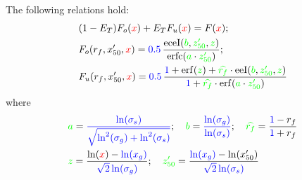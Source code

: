 \documentclass[12pt,reqno,intlimits,twoside]{amsart}
\DeclareMathOperator{\erf}{erf}%
\DeclareMathOperator{\erfc}{erfc}%
\DeclareMathOperator{\eeI}{eeI}%
\DeclareMathOperator{\eceI}{eceI}%
\begin{document}
The following relations hold:
\begin{align*}
   & (1 - E_T) F_o(\textcolor{red}{x}) + E_T F_u(\textcolor{red}{x})= F(\textcolor{red}{x});\\
   & F_o(r_f, x'_{50}, \textcolor{red}{x}) =
     \textcolor{blue}{0.5}\,
     \dfrac{\eceI(\textcolor{green}{b}, \textcolor{green}{z'_{50}}, \textcolor{green}{z})}%
           {\erfc(\textcolor{green}{a}\cdot \textcolor{green}{z'_{50}})};\\
   & F_u(r_f, x'_{50}, \textcolor{red}{x}) =
     \textcolor{blue}{0.5}\,
     \dfrac{\textcolor{blue}{1} +
            \erf(\textcolor{green}{z}) +
            \textcolor{green}{\widehat{r_f}}\cdot
            \eeI(\textcolor{green}{b}, \textcolor{green}{z'_{50}}, \textcolor{green}{z})
           }%
           {\textcolor{blue}{1} +
            \textcolor{green}{\widehat{r_f}}\cdot
            \erf(\textcolor{green}{a}\cdot \textcolor{green}{z'_{50}})
           }
\end{align*}
where
\begin{align*}
  &
  \textcolor{green}{a} =
  \textcolor{blue}{\dfrac{\ln(\sigma_s)}{\sqrt{\ln^2(\sigma_g) + \ln^2(\sigma_s)}}};\quad
  \textcolor{green}{b} =
  \textcolor{blue}{\dfrac{\ln(\sigma_g)}{\ln(\sigma_s)}};\quad
  \textcolor{green}{\widehat{r_f}} =
  \dfrac{\textcolor{blue}{1} - r_f}{\textcolor{blue}{1} + r_f}\\
  &
  \textcolor{green}{z} =
  \dfrac{\ln(\textcolor{red}{x}) - \textcolor{blue}{\ln(x_g)}}{\textcolor{blue}{\sqrt{2}\ln(\sigma_g)}};\quad
  \textcolor{green}{z'_{50}} =
  \dfrac{\textcolor{blue}{\ln(x_g)} - \ln(x'_{50})}{\textcolor{blue}{\sqrt{2}\ln(\sigma_s)}}
\end{align*}


\newpage
\end{document}
